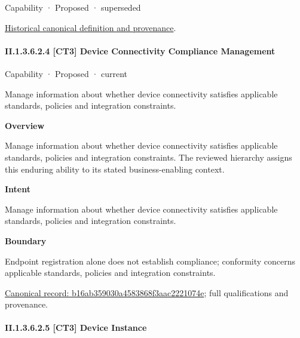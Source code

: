 \label{element:658d4b6770a943bcb5801fb7ca9b47be}
{\small Capability · Proposed · superseded}\par
\href{../../../../continuum/strategy/capability/658d4b6770a943bcb5801fb7ca9b47be.md}{Historical canonical definition and provenance}.\par
\paragraph*{II.1.3.6.2.4 [CT3] Device Connectivity Compliance Management}
\label{navigation:II.1.3.6.2.4}

\label{element:b16ab359030a4583868f3aac2221074e}
{\small Capability · Proposed · current}\par

Manage information about whether device connectivity satisfies applicable standards, policies and integration constraints.



\textbf{Overview}



Manage information about whether device connectivity satisfies applicable standards, policies and integration constraints. The reviewed hierarchy assigns this enduring ability to its stated business-enabling context.



\textbf{Intent}



Manage information about whether device connectivity satisfies applicable standards, policies and integration constraints.



\textbf{Boundary}



Endpoint registration alone does not establish compliance; conformity concerns applicable standards, policies and integration constraints.


{\footnotesize \href{../../../../continuum/strategy/capability/b16ab359030a4583868f3aac2221074e.md}{Canonical record: b16ab359030a4583868f3aac2221074e}; full qualifications and provenance.}\par
\paragraph*{II.1.3.6.2.5 [CT3] Device Instance}
\label{navigation:II.1.3.6.2.5}

